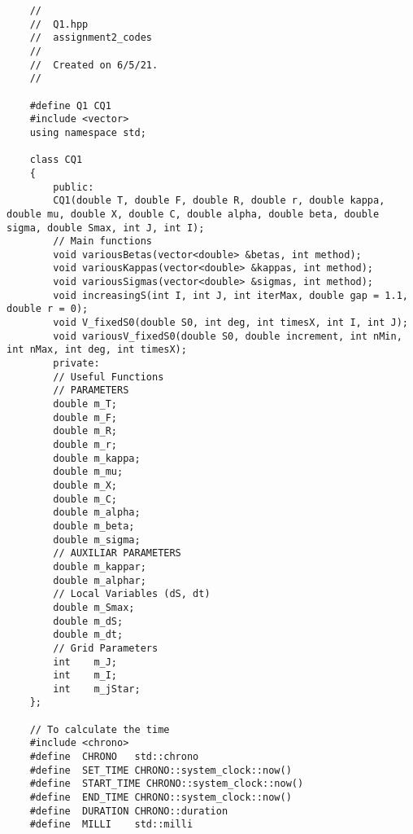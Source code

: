 \begin{lstlisting}
	//
	//  Q1.hpp
	//  assignment2_codes
	//
	//  Created on 6/5/21.
	//
	
	#define Q1 CQ1
	#include <vector>
	using namespace std;
	
	class CQ1
	{
		public:
		CQ1(double T, double F, double R, double r, double kappa, double mu, double X, double C, double alpha, double beta, double sigma, double Smax, int J, int I);
		// Main functions
		void variousBetas(vector<double> &betas, int method);
		void variousKappas(vector<double> &kappas, int method);
		void variousSigmas(vector<double> &sigmas, int method);
		void increasingS(int I, int J, int iterMax, double gap = 1.1,  double r = 0);
		void V_fixedS0(double S0, int deg, int timesX, int I, int J);
		void variousV_fixedS0(double S0, double increment, int nMin, int nMax, int deg, int timesX);
		private:
		// Useful Functions
		// PARAMETERS
		double m_T;
		double m_F;
		double m_R;
		double m_r;
		double m_kappa;
		double m_mu;
		double m_X;
		double m_C;
		double m_alpha;
		double m_beta;
		double m_sigma;
		// AUXILIAR PARAMETERS
		double m_kappar;
		double m_alphar;
		// Local Variables (dS, dt)
		double m_Smax;
		double m_dS;
		double m_dt;
		// Grid Parameters
		int    m_J;
		int    m_I;
		int    m_jStar;
	};
	
	// To calculate the time
	#include <chrono>
	#define  CHRONO   std::chrono
	#define  SET_TIME CHRONO::system_clock::now()
	#define  START_TIME CHRONO::system_clock::now()
	#define  END_TIME CHRONO::system_clock::now()
	#define  DURATION CHRONO::duration
	#define  MILLI    std::milli
\end{lstlisting}

